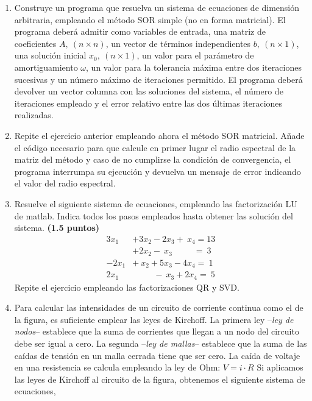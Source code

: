\begin{enumerate}
\item Construye un programa que resuelva un sistema de ecuaciones de dimensión arbitraria, empleando el método SOR  simple (no en forma matricial). El programa deberá admitir como variables de entrada, una matriz de coeficientes $ A,\ (n\times n)$, un vector de términos independientes $b,\ (n\times 1)$, una solución inicial $x_0 ,\ (n\times 1)$, un valor para el parámetro de amortiguamiento $\omega$, un valor para la tolerancia máxima entre dos iteraciones sucesivas y un número máximo de iteraciones permitido. El programa deberá devolver un vector columna con las soluciones del sistema, el número de iteraciones empleado y el error relativo entre las dos últimas iteraciones realizadas.

\item Repite el ejercicio anterior empleando ahora el método SOR matricial. Añade el código necesario para que calcule en primer lugar el radio espectral de la matriz del método y caso de no cumplirse  la condición de convergencia, el programa interrumpa su ejecución y devuelva un mensaje de error indicando el valor del radio espectral.


\item Resuelve el siguiente sistema de ecuaciones, empleando las factorización LU de matlab. Indica todos los pasos empleados hasta obtener las solución del sistema. \textbf{(1.5 puntos)}
\begin{align*}
3x_1&+3x_2-2x_3 +\ x_4= 13\\
 &+2x_2-\ x_3  \hspace{30pt} =\ 3\\
-2x_1&+\ x_2 + 5x_3 -4x_4=\ 1\\
2x_1& \hspace{30pt} -\ x_3 +2x_4 =\ 5
\end{align*}
Repite el ejercicio empleando las factorizaciones QR y SVD.

\item Para calcular las intensidades de un circuito de corriente continua como el de la figura, es suficiente emplear las leyes de Kirchoff. La primera ley --\emph{ley de nodos}-- establece que la suma de corrientes que llegan a un nodo del circuito debe ser igual a cero.
La segunda --\emph{ley de mallas}-- establece que la suma de las caídas de tensión en un malla cerrada tiene que ser cero. La caída de voltaje en una resistencia se calcula empleando la ley de Ohm: $V = i\cdot R$
Si aplicamos las leyes de Kirchoff al circuito de la figura, obtenemos  el siguiente sistema de ecuaciones,


\end{enumerate}

